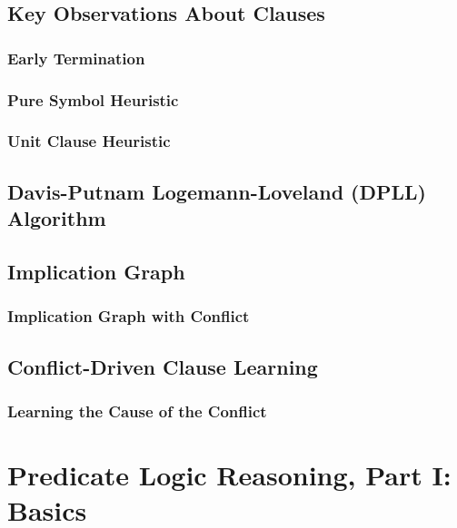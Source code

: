 \documentclass[conference, a4paper]{styles/acmsiggraph}
\begin{document}
    \subsection{Key Observations About Clauses}
        \subsubsection{Early Termination}
        \subsubsection{Pure Symbol Heuristic}
        \subsubsection{Unit Clause Heuristic}
    \subsection{Davis-Putnam Logemann-Loveland (DPLL) Algorithm}
    \subsection{Implication Graph}
        \subsubsection{Implication Graph with Conflict}
    \subsection{Conflict-Driven Clause Learning}
        \subsubsection{Learning the Cause of the Conflict}
    
    
    
    
    
    
    
    
    
    

    
    
\section{Predicate Logic Reasoning, Part I: Basics}
\end{document}
